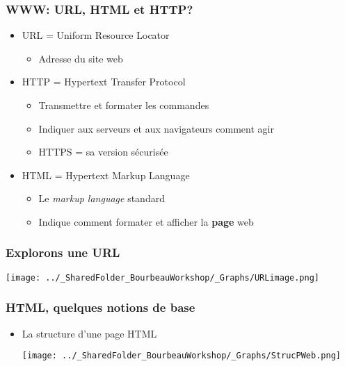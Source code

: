 \documentclass{beamer}
\begin{document}
      \begin{frame}
        \frametitle{WWW: URL, HTML et HTTP?}
        \begin{itemize}
          \item<2-> URL = Uniform Resource Locator
            \begin{itemize}
              \item Adresse du site web
            \end{itemize}
          \item<3-> HTTP = Hypertext Transfer Protocol
            \begin{itemize}
              \item Transmettre et formater les commandes
              \item Indiquer aux serveurs et aux navigateurs comment agir
              \item HTTPS = sa version sécurisée
            \end{itemize}
          \item<4-> HTML = Hypertext Markup Language
            \begin{itemize}
              \item Le \textit{markup language} standard
              \item Indique comment formater et afficher la \textbf{page} web
            \end{itemize}
        \end{itemize}
      \end{frame}
      
      \begin{frame}
        \frametitle{Explorons une URL} \vspace{1cm}
          \begin{center}
            \texttt{[image: ../\_SharedFolder\_BourbeauWorkshop/\_Graphs/URLimage.png]}
          \end{center}
      \end{frame}
      
      \begin{frame}
        \frametitle{HTML, quelques notions de base} \vspace{0.3cm}
        \begin{itemize}
          \item<2-> La structure d'une page HTML 
            \begin{center}
            \texttt{[image: ../\_SharedFolder\_BourbeauWorkshop/\_Graphs/StrucPWeb.png]}
            \end{center}
        \end{itemize}
      \end{frame}
      
\end{document}
